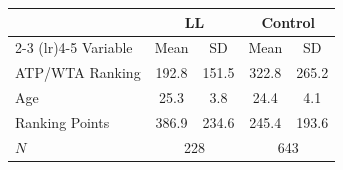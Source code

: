 \begin{tabular}{l cccc}
\toprule
 & \multicolumn{2}{c}{LL} & \multicolumn{2}{c}{Control} \\
\cmidrule(lr){2-3} \cmidrule(lr){4-5}
Variable & Mean & SD & Mean & SD \\
\midrule
ATP/WTA Ranking & 192.8 & 151.5 & 322.8 & 265.2 \\
Age & 25.3 & 3.8 & 24.4 & 4.1 \\
Ranking Points & 386.9 & 234.6 & 245.4 & 193.6 \\
\midrule
$N$ & \multicolumn{2}{c}{228} & \multicolumn{2}{c}{643} \\
\bottomrule
\end{tabular}
